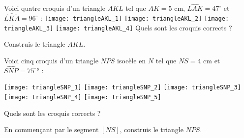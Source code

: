 
\begin{activite}

\begin{partie}
Voici quatre croquis d'un triangle $AKL$ tel que $AK = 5$ cm, $\widehat{LAK} = 47^\circ$ et $\widehat{LKA} = 96^\circ$ :
\texttt{[image: triangleAKL\_1]} \hfill \texttt{[image: triangleAKL\_2]} \hfill \texttt{[image: triangleAKL\_3]} \hfill \texttt{[image: triangleAKL\_4]}
Quels sont les croquis corrects ?
\end{partie}

\begin{partie}
Construis le triangle $AKL$.
\end{partie}

\end{activite}



\begin{activite}

\begin{partie}
Voici cinq croquis d'un triangle $NPS$ isocèle en $N$ tel que $NS = 4$ cm et $\widehat{SNP} = 75^\circ°$ :

\texttt{[image: triangleSNP\_1]} \hfill \texttt{[image: triangleSNP\_2]} \hfill \texttt{[image: triangleSNP\_3]} \hfill \texttt{[image: triangleSNP\_4]} \hfill \texttt{[image: triangleSNP\_5]} 

Quels sont les croquis corrects ?
\end{partie}

\begin{partie}
En commençant par le segment $[NS]$, construis le triangle $NPS$.
\end{partie}

\end{activite}
